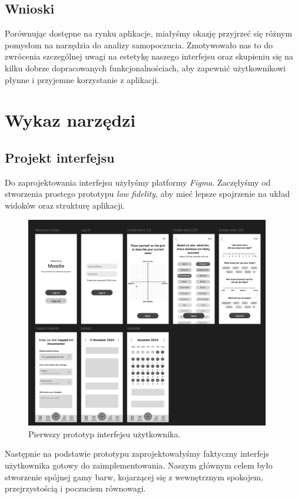 \documentclass[inz, shortabstract]{iithesis}
\begin{document}
\section{Wnioski}
Porównując dostępne na rynku aplikacje, miałyśmy okazję przyjrzeć się różnym pomysłom na narzędzia do analizy samopoczucia. Zmotywowało nas to do zwrócenia szczególnej uwagi na estetykę naszego interfejsu oraz skupieniu się na kilku dobrze dopracowanych funkcjonalnościach, aby zapewnić użytkownikowi płynne i przyjemne korzystanie z aplikacji.


\chapter{Wykaz narzędzi}
\section{Projekt interfejsu}

Do zaprojektowania interfejsu użyłyśmy platformy \textit{Figma}. Zaczęłyśmy od stworzenia prostego prototypu \textit{low fidelity}, aby mieć lepsze spojrzenie na układ widoków oraz strukturę aplikacji.

\begin{figure}[!h]
\centering
\includegraphics[width=0.95\textwidth]{figma-ui-lofi.png} 
\caption{Pierwszy prototyp interfejsu użytkownika.}
\end{figure}

Następnie na podstawie prototypu zaprojektowałyśmy faktyczny interfejs użytkownika gotowy do zaimplementowania. Naszym głównym celem było stworzenie spójnej gamy barw, kojarzącej się z wewnętrznym spokojem, przejrzystością i poczuciem równowagi.
\end{document}
